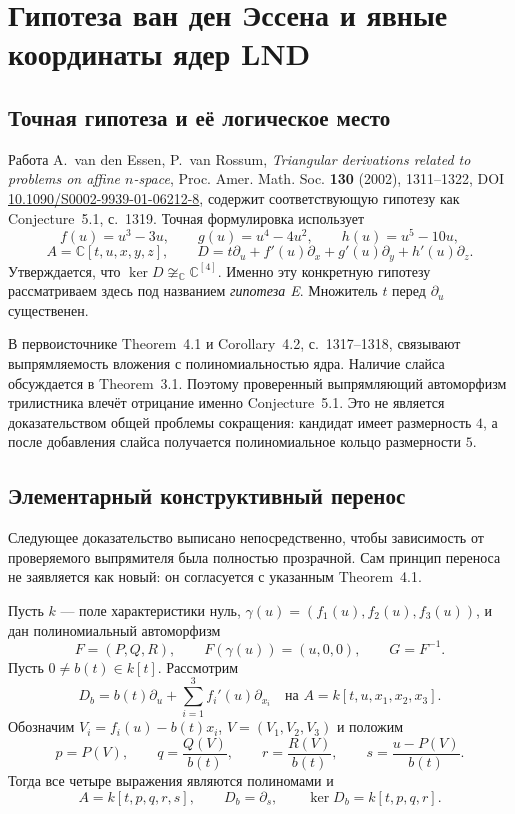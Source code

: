 \section{Гипотеза ван ден Эссена и явные координаты ядер LND}

\subsection{Точная гипотеза и её логическое место}

Работа A.~van den Essen, P.~van Rossum, \emph{Triangular derivations related
to problems on affine $n$-space}, Proc. Amer. Math. Soc. \textbf{130}
(2002), 1311--1322, DOI
\href{https://doi.org/10.1090/S0002-9939-01-06212-8}{10.1090/S0002-9939-01-06212-8},
содержит соответствующую гипотезу как Conjecture~5.1, с.~1319.
Точная формулировка использует
\[
 f(u)=u^3-3u,\qquad g(u)=u^4-4u^2,\qquad h(u)=u^5-10u,
\]
\[
 A=\mathbb C[t,u,x,y,z],\qquad
 D=t\partial_u+f'(u)\partial_x+g'(u)\partial_y+h'(u)\partial_z.
\]
Утверждается, что $\ker D\not\cong_{\mathbb C}\mathbb C^{[4]}$.
Именно эту конкретную гипотезу рассматриваем здесь под названием
\emph{гипотеза E}. Множитель $t$ перед $\partial_u$ существенен.

В первоисточнике Theorem~4.1 и Corollary~4.2, с.~1317--1318, связывают
выпрямляемость вложения с полиномиальностью ядра. Наличие слайса
обсуждается в Theorem~3.1. Поэтому проверенный выпрямляющий автоморфизм
трилистника влечёт отрицание именно Conjecture~5.1. Это не является
доказательством общей проблемы сокращения: кандидат имеет размерность
$4$, а после добавления слайса получается полиномиальное кольцо
размерности $5$.

\subsection{Элементарный конструктивный перенос}

Следующее доказательство выписано непосредственно, чтобы зависимость от
проверяемого выпрямителя была полностью прозрачной. Сам принцип переноса
не заявляется как новый: он согласуется с указанным Theorem~4.1.

Пусть $k$ --- поле характеристики нуль,
$\gamma(u)=(f_1(u),f_2(u),f_3(u))$, и дан полиномиальный автоморфизм
\[
 F=(P,Q,R),\qquad F(\gamma(u))=(u,0,0),\qquad G=F^{-1}.
\]
Пусть $0\ne b(t)\in k[t]$. Рассмотрим
\[
 D_b=b(t)\partial_u+\sum_{i=1}^3f_i'(u)\partial_{x_i}
 \quad\text{на }A=k[t,u,x_1,x_2,x_3].
\]
Обозначим $V_i=f_i(u)-b(t)x_i$, $V=(V_1,V_2,V_3)$ и положим
\begin{equation}\label{eq:lnd-coordinates}
 p=P(V),\qquad q=\frac{Q(V)}{b(t)},\qquad
 r=\frac{R(V)}{b(t)},\qquad s=\frac{u-P(V)}{b(t)}.
\end{equation}
Тогда все четыре выражения являются полиномами и
\begin{equation}\label{eq:lnd-conjugacy}
 A=k[t,p,q,r,s],\qquad D_b=\partial_s,\qquad
 \ker D_b=k[t,p,q,r].
\end{equation}

